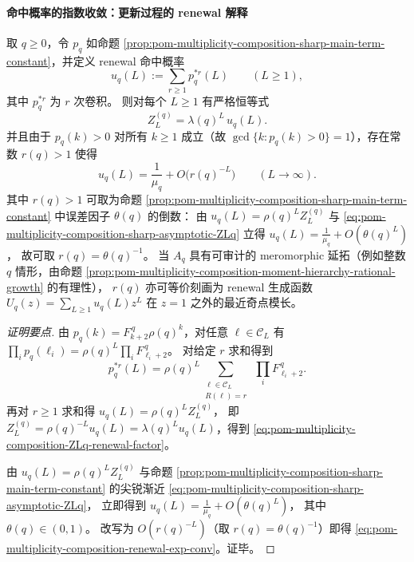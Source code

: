 \paragraph{命中概率的指数收敛：更新过程的 renewal 解释}
\begin{proposition}\label{prop:pom-multiplicity-composition-renewal-hit-prob}
取 \(q\ge 0\)，令 \(p_q\) 如命题 \ref{prop:pom-multiplicity-composition-sharp-main-term-constant}，并定义 renewal 命中概率
\[
u_q(L):=\sum_{r\ge 1}p_q^{*r}(L)\qquad(L\ge 1),
\]
其中 \(p_q^{*r}\) 为 \(r\) 次卷积。
则对每个 \(L\ge 1\) 有严格恒等式
\begin{equation}\label{eq:pom-multiplicity-composition-ZLq-renewal-factor}
\boxed{\;
Z_L^{(q)}=\lambda(q)^{L}\,u_q(L).\;}
\end{equation}
并且由于 \(p_q(k)>0\) 对所有 \(k\ge 1\) 成立（故 \(\gcd\{k:p_q(k)>0\}=1\)），存在常数 \(r(q)>1\) 使得
\begin{equation}\label{eq:pom-multiplicity-composition-renewal-exp-conv}
\boxed{\;
u_q(L)=\frac{1}{\mu_q}+O\!\bigl(r(q)^{-L}\bigr)\qquad(L\to\infty).\;}
\end{equation}
其中 \(r(q)>1\) 可取为命题 \ref{prop:pom-multiplicity-composition-sharp-main-term-constant} 中误差因子 \(\theta(q)\) 的倒数：
由 \(u_q(L)=\rho(q)^L Z_L^{(q)}\) 与 \eqref{eq:pom-multiplicity-composition-sharp-asymptotic-ZLq} 立得
\(
u_q(L)=\frac{1}{\mu_q}+O(\theta(q)^L)
\)，
故可取
\(
r(q)=\theta(q)^{-1}
\)。
当 \(A_q\) 具有可审计的 meromorphic 延拓（例如整数 \(q\) 情形，由命题 \ref{prop:pom-multiplicity-composition-moment-hierarchy-rational-growth} 的有理性），
\(r(q)\) 亦可等价刻画为 renewal 生成函数
\(
U_q(z)=\sum_{L\ge 1}u_q(L)z^L
\)
在 \(z=1\) 之外的最近奇点模长。
\end{proposition}
\begin{proof}[证明要点]
由 \(p_q(k)=F_{k+2}^{\,q}\rho(q)^k\)，对任意 \(\boldsymbol{\ell}\in\mathcal{C}_L\) 有
\(
\prod_i p_q(\ell_i)=\rho(q)^{L}\prod_i F_{\ell_i+2}^{\,q}
\)。
对给定 \(r\) 求和得到
\[
p_q^{*r}(L)=\rho(q)^L\sum_{\substack{\boldsymbol{\ell}\in\mathcal{C}_L\\ R(\boldsymbol{\ell})=r}}\ \prod_i F_{\ell_i+2}^{\,q}.
\]
再对 \(r\ge 1\) 求和得
\(
u_q(L)=\rho(q)^L Z_L^{(q)}
\)，
即 \(Z_L^{(q)}=\rho(q)^{-L}u_q(L)=\lambda(q)^L u_q(L)\)，得到 \eqref{eq:pom-multiplicity-composition-ZLq-renewal-factor}。
\par
由 \(u_q(L)=\rho(q)^L Z_L^{(q)}\) 与命题 \ref{prop:pom-multiplicity-composition-sharp-main-term-constant} 的尖锐渐近 \eqref{eq:pom-multiplicity-composition-sharp-asymptotic-ZLq}，
立即得到
\(
u_q(L)=\frac{1}{\mu_q}+O(\theta(q)^L)
\)，
其中 \(\theta(q)\in(0,1)\)。
改写为 \(O(r(q)^{-L})\)（取 \(r(q)=\theta(q)^{-1}\)）即得 \eqref{eq:pom-multiplicity-composition-renewal-exp-conv}。证毕。
\end{proof}


